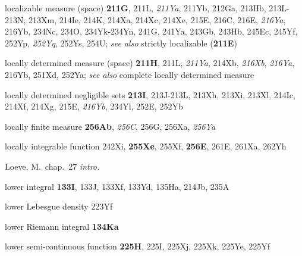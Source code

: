 



localizable measure (space) {\bf 211G}, 211L, {\it 211Ya}, 211Yb,
212Ga, 213Hb, 213L-213N, 
213Xm, 214Ie, 214K, 214Xa, 214Xc, 214Xe, 215E, 216C, 216E,
{\it 216Ya}, 216Yb, 234Nc, 234O,
234Yk-234Yn, 
241G, 241Ya, 243Gb, 243Hb,
245Ec, 245Yf,
252Yp, {\it 252Yq}, 252Ys, 254U; 
  {\it see also} strictly localizable ({\bf 211E})




















locally determined measure (space) {\bf 211H}, 211L, {\it 211Ya},
214Xb, {\it 216Xb}, {\it 216Ya}, 216Yb, 251Xd, 252Ya; 
  {\it see also} complete locally determined measure


locally determined negligible sets {\bf 213I},
213J-213L, 
213Xh, 213Xi, 213Xl,
214Ic, 214Xf, 214Xg, 215E, {\it 216Yb}, 234Yl, 252E, 252Yb




locally finite measure {\bf 256Ab}, {\it 256C}, 256G, 256Xa, {\it
256Ya}






locally integrable function 242Xi, {\bf 255Xe}, 255Xf, {\bf 256E},
261E, 261Xa, 262Yh








Lo{\grv e}ve, M.\  chap.\ 27 {\it intro.}
















lower integral {\bf 133I}, 133J, 133Xf, 133Yd, 135Ha,
  214Jb, 235A

lower Lebesgue density 223Yf




lower Riemann integral {\bf 134Ka}

lower semi-continuous function {\bf 225H}, 225I, 225Xj, 225Xk,
225Ye, 225Yf







